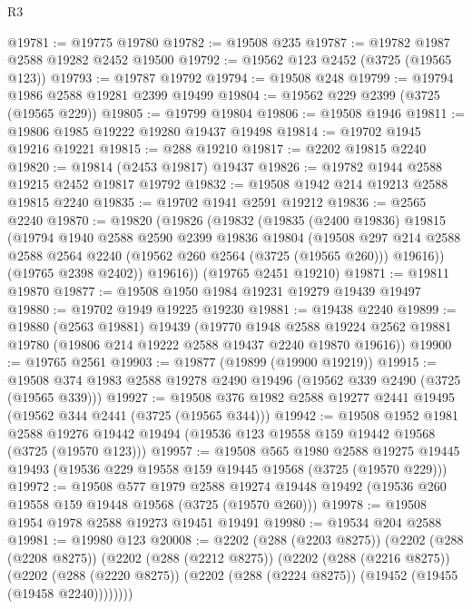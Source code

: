 \begin{lexlean}{R3}
\begin{coremodule}
@19781 := @19775 @19780
@19782 := @19508 @235
@19787 := @19782 @1987 @2588 @19282 @2452 @19500
@19792 := @19562 @123 @2452 (@3725 (@19565 @123))
@19793 := @19787 @19792
@19794 := @19508 @248
@19799 := @19794 @1986 @2588 @19281 @2399 @19499
@19804 := @19562 @229 @2399 (@3725 (@19565 @229))
@19805 := @19799 @19804
@19806 := @19508 @1946
@19811 := @19806 @1985 @19222 @19280 @19437 @19498
@19814 := @19702 @1945 @19216 @19221
@19815 := @288 @19210
@19817 := @2202 @19815 @2240
@19820 := @19814 (@2453 @19817) @19437
@19826 := @19782 @1944 @2588 @19215 @2452 @19817 @19792
@19832 := @19508 @1942 @214 @19213 @2588 @19815 @2240
@19835 := @19702 @1941 @2591 @19212
@19836 := @2565 @2240
@19870 := @19820
    (@19826
      (@19832
        (@19835
          (@2400 @19836)
          @19815
          (@19794
            @1940
            @2588
            @2590
            @2399
            @19836
            @19804
            (@19508
              @297
              @214
              @2588
              @2588
              @2564
              @2240
              (@19562 @260 @2564 (@3725 (@19565 @260)))
              @19616))
          (@19765 @2398 @2402))
        @19616))
    (@19765 @2451 @19210)
@19871 := @19811 @19870
@19877 := @19508 @1950 @1984 @19231 @19279 @19439 @19497
@19880 := @19702 @1949 @19225 @19230
@19881 := @19438 @2240
@19899 := @19880
    (@2563 @19881)
    @19439
    (@19770
      @1948
      @2588
      @19224
      @2562
      @19881
      @19780
      (@19806 @214 @19222 @2588 @19437 @2240 @19870 @19616))
@19900 := @19765 @2561
@19903 := @19877 (@19899 (@19900 @19219))
@19915 := @19508 @374 @1983 @2588 @19278 @2490 @19496 (@19562 @339 @2490 (@3725 (@19565 @339)))
@19927 := @19508 @376 @1982 @2588 @19277 @2441 @19495 (@19562 @344 @2441 (@3725 (@19565 @344)))
@19942 := @19508
    @1952
    @1981
    @2588
    @19276
    @19442
    @19494
    (@19536 @123 @19558 @159 @19442 @19568 (@3725 (@19570 @123)))
@19957 := @19508
    @565
    @1980
    @2588
    @19275
    @19445
    @19493
    (@19536 @229 @19558 @159 @19445 @19568 (@3725 (@19570 @229)))
@19972 := @19508
    @577
    @1979
    @2588
    @19274
    @19448
    @19492
    (@19536 @260 @19558 @159 @19448 @19568 (@3725 (@19570 @260)))
@19978 := @19508 @1954 @1978 @2588 @19273 @19451 @19491
@19980 := @19534 @204 @2588
@19981 := @19980 @123
@20008 := @2202
    (@288 (@2203 @8275))
    (@2202
      (@288 (@2208 @8275))
      (@2202
        (@288 (@2212 @8275))
        (@2202
          (@288 (@2216 @8275))
          (@2202
            (@288 (@2220 @8275))
            (@2202 (@288 (@2224 @8275)) (@19452 (@19455 (@19458 @2240))))))))

\end{coremodule}
\end{lexlean}
